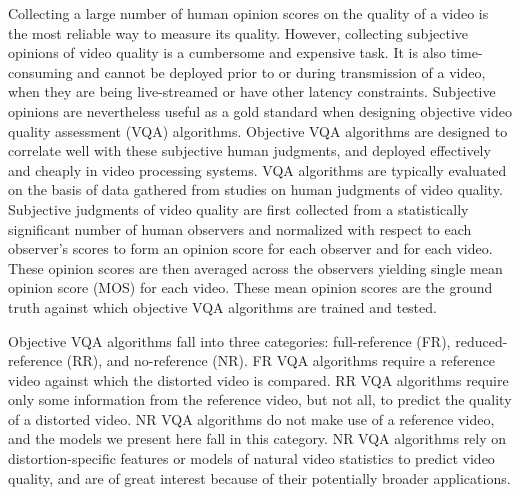 \documentclass[journal]{IEEEtran}
\begin{document}
Collecting a large number of human opinion scores on the quality of a video is the most reliable way to measure its quality. However, collecting subjective opinions of video quality is a cumbersome and expensive task. It is also time-consuming and cannot be deployed prior to or during transmission of a video, when they are being live-streamed or have other latency constraints. Subjective opinions are nevertheless useful as a gold standard when designing objective video quality assessment (VQA) algorithms. Objective VQA algorithms are designed to correlate well with these subjective human judgments, and deployed effectively and cheaply in video processing systems. VQA algorithms are typically evaluated on the basis of data gathered from studies on human judgments of video quality. Subjective judgments of video quality are first collected from a statistically significant number of human observers and normalized with respect to each observer's scores to form an opinion score for each observer and for each video. These opinion scores are then averaged across the observers yielding single mean opinion score (MOS) for each video. These mean opinion scores are the ground truth against which objective VQA algorithms are trained and tested. 

Objective VQA algorithms fall into three categories: full-reference (FR), reduced-reference (RR), and no-reference (NR). FR VQA algorithms require a reference video against which the distorted video is compared. RR VQA algorithms require only some information from the reference video, but not all, to predict the quality of a distorted video. NR VQA algorithms do not make use of a reference video, and the models we present here fall in this category. NR VQA algorithms rely on distortion-specific features or models of natural video statistics to predict video quality, and are of great interest because of their potentially broader applications.
\end{document}
